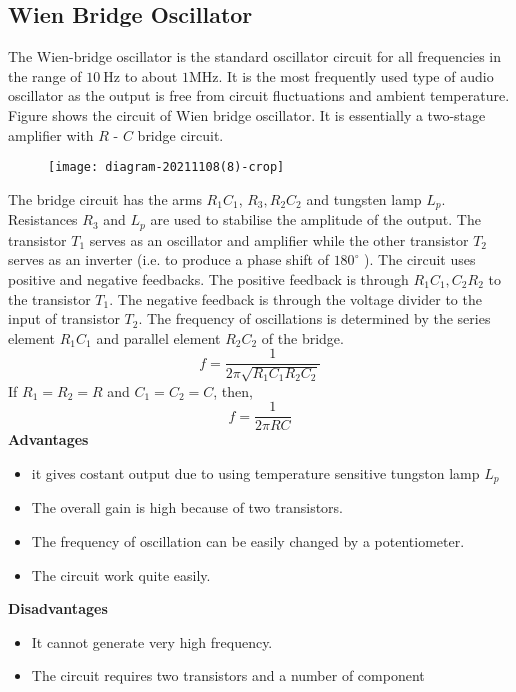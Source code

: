  \subsection{Wien Bridge Oscillator}
The Wien-bridge oscillator is the standard oscillator circuit for all frequencies in the range of $10 \mathrm{~Hz}$ to about $1 \mathrm{MHz}$. It is the most frequently used type of audio oscillator as the output is free from circuit fluctuations and ambient temperature. Figure shows the circuit of Wien bridge
 oscillator. It is essentially a two-stage amplifier with $R$ - $C$ bridge circuit.\\
  \begin{figure}[H]
  	\centering
  	\texttt{[image: diagram-20211108(8)-crop]}
  	\caption{}
  	\label{}
  \end{figure}
 \par The bridge circuit has the arms $R_{1} C_{1}$, $R_{3}, R_{2} C_{2}$ and tungsten lamp $L_{p} .$ Resistances $R_{3}$ and $L_{p}$ are used to stabilise the amplitude of the output. The transistor $T_{1}$ serves as an oscillator and amplifier while the other transistor $T_{2}$ serves as an inverter (i.e. to produce a phase shift of $180^{\circ}$ ). The circuit uses positive and negative feedbacks. The positive feedback is through $R_{1} C_{1}, C_{2} R_{2}$ to the transistor $T_{1}$. The negative feedback is through the voltage divider to the input of transistor $T_{2}$. The frequency of oscillations is determined by the series element $R_{1} C_{1}$ and parallel element $R_{2} C_{2}$ of the bridge.
$$
f=\frac{1}{2 \pi \sqrt{R_{1} C_{1} R_{2} C_{2}}}
$$
If $R_{1}=R_{2}=R$
and $C_{1}=C_{2}=C$, then,
$$
f=\frac{1}{2 \pi R C}
$$
\textbf{Advantages}
\begin{itemize}
	\item it gives costant output due to using temperature sensitive tungston lamp $L_p$
	\item The overall gain is high because of two transistors.
	\item The frequency of oscillation can be easily changed by a potentiometer.
	\item The circuit work quite easily.
\end{itemize}
	\textbf{Disadvantages}
\begin{itemize}	
	\item It cannot generate very high frequency.
	\item The circuit requires two transistors and a number of component
\end{itemize}
